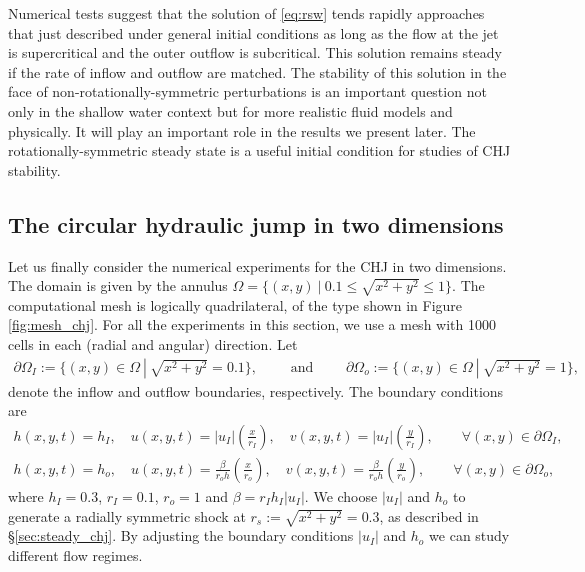 \documentclass[preprint, 11pt]{article}
\newcommand{\bfu}{{u}}
\begin{document}
Numerical tests suggest that the solution of \eqref{eq:rsw} tends rapidly approaches that
just described under general initial conditions as long as the flow at the jet is
supercritical and the outer outflow is subcritical.  This solution remains steady
if the rate of inflow and outflow are matched.  The stability of this solution in
the face of non-rotationally-symmetric perturbations is an important question not
only in the shallow water context but for more realistic fluid models and physically.
It will play an important role in the results we present later.
The rotationally-symmetric steady state is a useful initial condition for studies
of CHJ stability.


\subsection{The circular hydraulic jump in two dimensions}\label{sec:2D_chj}
Let us finally consider the numerical experiments for the CHJ in two dimensions.
The domain is given by the annulus $\Omega=\{(x,y)~|~ 0.1\leq\sqrt{x^2+y^2}\leq 1\}$.
The computational mesh is logically quadrilateral, of the type shown in Figure \ref{fig:mesh_chj}.
For all the experiments in this section, we use a mesh with 1000 cells in each (radial
and angular) direction.
Let
\begin{align*}
  \partial\Omega_I:=\{(x,y)\in\Omega ~|~ \sqrt{x^2+y^2}=0.1\}, \qquad \mbox{ and } \qquad
  \partial\Omega_o:=\{(x,y)\in\Omega ~|~ \sqrt{x^2+y^2}=1\},
\end{align*}
denote the inflow and outflow boundaries, respectively. 
The boundary conditions are 
\begin{subequations}\label{bcs_chj}
  \begin{align}
  h(x,y,t)=h_I, \quad
  u(x,y,t)=|\bfu_I| \left(\frac{x}{r_I}\right), \quad
  v(x,y,t)=|\bfu_I| \left(\frac{y}{r_I}\right), \qquad \forall (x,y)\in\partial\Omega_I, \\
  h(x,y,t)=h_o, \quad 
  u(x,y,t)= \frac{\beta }{r_o h}\left(\frac{x}{r_o}\right), \quad
  v(x,y,t)= \frac{\beta }{r_o h}\left(\frac{y}{r_o}\right), \qquad \forall (x,y)\in\partial\Omega_o, \label{bcs_chj_outflow}
  \end{align}
\end{subequations}
where $h_I=0.3$, $r_I=0.1$, $r_o=1$ and $\beta=r_Ih_I|\bfu_I|$.
We choose $|\bfu_I|$ and $h_o$ to generate a radially symmetric shock at $r_s:=\sqrt{x^2+y^2}=0.3$, as described in \S \ref{sec:steady_chj}.
By adjusting the boundary conditions $|\bfu_I|$ and $h_o$ we can study different flow regimes.
\end{document}
